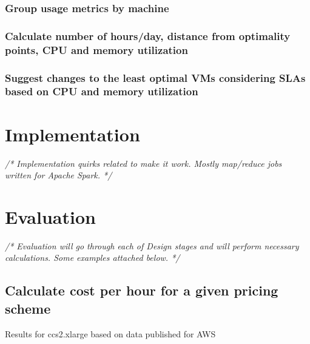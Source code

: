 \documentclass[]{final_report}
\begin{document}
\subsection{Group usage metrics by machine}
\subsection{Calculate number of hours/day, distance from optimality points, CPU and memory utilization}
\subsection{Suggest changes to the least optimal VMs considering SLAs based on CPU and memory utilization}


\chapter{Implementation}

\emph{/* Implementation quirks related to make it work. Mostly map/reduce jobs written for Apache Spark. */}


\chapter{Evaluation}

\emph{/* Evaluation will go through each of Design stages and will perform necessary calculations. Some examples attached below. */}

\section{Calculate cost per hour for a given pricing scheme}
Results for ccs2.xlarge based on data published for AWS~\cite{AWS:2014} \par
{}
\end{document}
